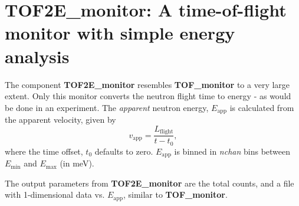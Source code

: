 \section{TOF2E\_monitor: A time-of-flight monitor with simple energy analysis} \label{s:TOF2E_monitor}

The component \textbf{TOF2E\_monitor} resembles \textbf{TOF\_monitor}
to a very large extent. Only this monitor converts the neutron flight
time to energy - as would be done in an experiment.
The {\em apparent} neutron energy, $E_\textrm{app}$ is calculated 
from the apparent velocity, given by 
\begin{equation}
v_\textrm{app} = \frac{L_\textrm{flight}}{t-t_0} ,
\end{equation}
where the time offset, $t_0$ defaults to zero.
$E_\textrm{app}$ is binned in \textit{nchan} bins between
$E_\textrm{min}$ and $E_\textrm{max}$ (in meV).

The output parameters from \textbf{TOF2E\_monitor} are the total counts,
and a file with 1-dimensional data vs. $E_\textrm{app}$, 
similar to \textbf{TOF\_monitor}.

